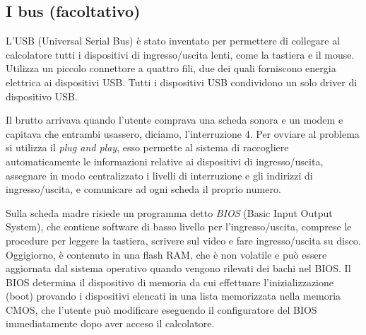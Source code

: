 \subsection{I bus (facoltativo)}

 L'USB (Universal Serial Bus) è stato inventato per permettere di collegare al calcolatore tutti i dispositivi di ingresso/uscita lenti, come la tastiera e il mouse. Utilizza un piccolo connettore a quattro fili, due dei quali forniscono energia elettrica ai dispositivi USB. Tutti i dispositivi USB condividono un solo driver di dispositivo USB.

 Il brutto arrivava quando l'utente comprava una scheda sonora e un modem e capitava che entrambi usassero, diciamo, l'interruzione 4. Per ovviare al problema si utilizza il \textit{plug and play}, esso permette al sistema di raccogliere automaticamente le informazioni relative ai dispositivi di ingresso/uscita, assegnare in modo centralizzato i livelli di interruzione e gli indirizzi di ingresso/uscita, e comunicare ad ogni scheda il proprio numero. 
 
 Sulla scheda madre risiede un programma detto \textit{BIOS} (Basic Input Output System), che contiene software di basso livello per l'ingresso/uscita, comprese le procedure per leggere la tastiera, scrivere sul video e fare ingresso/uscita su disco. Oggigiorno, è contenuto in una flash RAM, che è non volatile e può essere aggiornata dal sistema operativo quando vengono rilevati dei bachi nel BIOS. Il BIOS determina il dispositivo di memoria da cui effettuare l'inizializzazione (boot) provando i dispositivi elencati in una lista memorizzata nella memoria CMOS, che l'utente può modificare eseguendo il configuratore del BIOS immediatamente dopo aver acceso il calcolatore.



